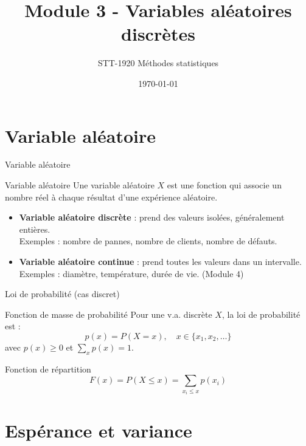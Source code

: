 \documentclass{BeamerTemplate}
\title{Module 3 - Variables aléatoires discrètes}
\subtitle{STT-1920 Méthodes statistiques}
\date{\today}
\begin{document}
\begin{frame}[t]
  \titlepage
\end{frame}

\section{Variable aléatoire}

\begin{frame}[t]{Variable aléatoire}

\begin{Boite}{Variable aléatoire}
Une variable aléatoire $X$ est une fonction qui associe un nombre réel à chaque résultat d'une expérience aléatoire.
\end{Boite}

\medskip
\begin{itemize}\itemsep5mm
  \item \textbf{Variable aléatoire discrète} : prend des valeurs isolées, généralement entières.\\
  Exemples : nombre de pannes, nombre de clients, nombre de défauts.
  \item \textbf{Variable aléatoire continue} : prend toutes les valeurs dans un intervalle.\\
  Exemples : diamètre, température, durée de vie. (Module 4)
\end{itemize}

\end{frame}

\begin{frame}[t]{Loi de probabilité (cas discret)}

\begin{Boite}{Fonction de masse de probabilité}
Pour une v.a. discrète $X$, la loi de probabilité est :
$$p(x) = P(X = x), \quad x \in \{x_1, x_2, \ldots\}$$
avec $p(x) \ge 0$ et $\displaystyle\sum_x p(x) = 1$.
\end{Boite}

\medskip
\begin{Boite}{Fonction de répartition}
$$F(x) = P(X \le x) = \sum_{x_i \le x} p(x_i)$$
\end{Boite}

\end{frame}

\section{Espérance et variance}
\end{document}
